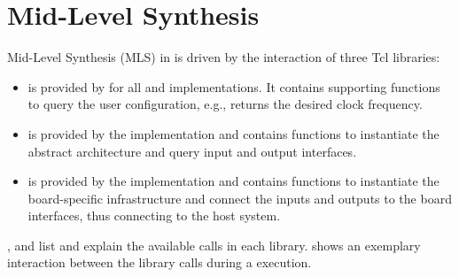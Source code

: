 \section{Mid-Level Synthesis}\label{sec:mls}%
Mid-Level Synthesis (MLS) in \tapasco{} is driven by the interaction of three Tcl libraries:
%
\begin{itemize}
  \item {} is provided by \tapasco{} for all  and  implementations. It contains supporting functions to query the user configuration, e.g.,  returns the desired clock frequency.
  \item {} is provided by the  implementation and contains functions to instantiate the abstract architecture and query input and output interfaces.
  \item {} is provided by the  implementation and contains functions to instantiate the board-specific infrastructure and connect the  inputs and outputs to the board interfaces, thus connecting to the host system.
\end{itemize}
%
,  and  list and explain the available calls in each library.
 shows an exemplary interaction between the library calls during a  execution.

